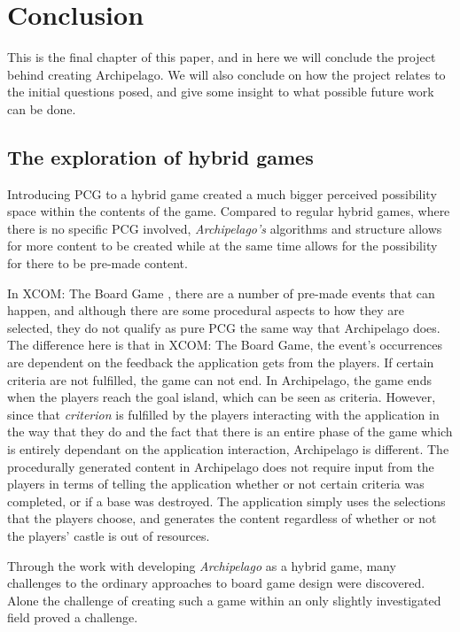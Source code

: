 \chapter{Conclusion}
This is the final chapter of this paper, and in here we will conclude the project behind creating Archipelago. We will also conclude on how the project relates to the initial questions posed, and give some insight to what possible future work can be done.


\section{The exploration of hybrid games}
Introducing PCG to a hybrid game created a much bigger perceived possibility space within the contents of the game. Compared to regular hybrid games, where there is no specific PCG involved, \textit{Archipelago's} algorithms and structure allows for more content to be created while at the same time allows for the possibility for there to be pre-made content. 

In XCOM: The Board Game \cite{game:xcomtbg}, there are a number of pre-made events that can happen, and although there are some procedural aspects to how they are selected, they do not qualify as pure PCG the same way that Archipelago does. The difference here is that in XCOM: The Board Game, the event's occurrences are dependent on the feedback the application gets from the players. If certain criteria are not fulfilled, the game can not end. In Archipelago, the game ends when the players reach the goal island, which can be seen as criteria. However, since that \textit{criterion} is fulfilled by the players interacting with the application in the way that they do and the fact that there is an entire phase of the game which is entirely dependant on the application interaction, Archipelago is different. The procedurally generated content in Archipelago does not require input from the players in terms of telling the application whether or not certain criteria was completed, or if a base was destroyed. The application simply uses the selections that the players choose, and generates the content regardless of whether or not the players' castle is out of resources.

Through the work with developing \textit{Archipelago} as a hybrid game, many challenges to the ordinary approaches to board game design were discovered. Alone the challenge of creating such a game within an only slightly investigated field proved a challenge.


